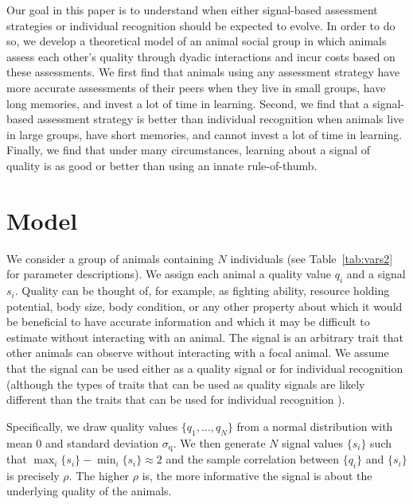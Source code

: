 Our goal in this paper is to understand when either signal-based assessment strategies or individual recognition should be expected to evolve.  In order to do so, we develop a theoretical model of an animal social group in which animals assess each other's quality through dyadic interactions and incur costs based on these assessments. We first find that animals using any assessment strategy have more accurate assessments of their peers when they live in small groups, have long memories, and invest a lot of time in learning. Second, we find that a signal-based assessment strategy is better than individual recognition when animals live in large groups, have short memories, and cannot invest a lot of time in learning. Finally, we find that under many circumstances, learning about a signal of quality is as good or better than using an innate rule-of-thumb. 
 

\section*{Model } 

We consider a group of animals containing $N$ individuals (see Table~\ref{tab:vars2} for parameter descriptions). We assign each animal a quality value $q_i$ and a signal $s_i$. Quality can be thought of, for example, as fighting ability, resource holding potential, body size, body condition, or any other property about which it would be beneficial to have accurate information and which it may be difficult to estimate without interacting with an animal. The signal is an arbitrary trait that other animals can observe without interacting with a focal animal.  We assume that the signal can be used either as a quality signal or for individual recognition (although the types of traits that can be used  as quality signals are likely different than the traits that can be used for individual recognition \citep{Dale:2001dv}).

Specifically, we draw quality values $\{q_1,\dots,q_N\}$ from a normal distribution with mean $0$ and standard deviation $\sigma_\text{q}$. We then generate $N$ signal values $\{s_i\}$ such that 
$\max_i\{s_i\}-\min_i\{s_i\}\approx 2$ and the sample correlation between $\{q_i\}$ and $\{s_i\}$ is precisely $\rho$. 
The higher $\rho$ is, the more informative the signal is about the underlying quality of the animals. 

